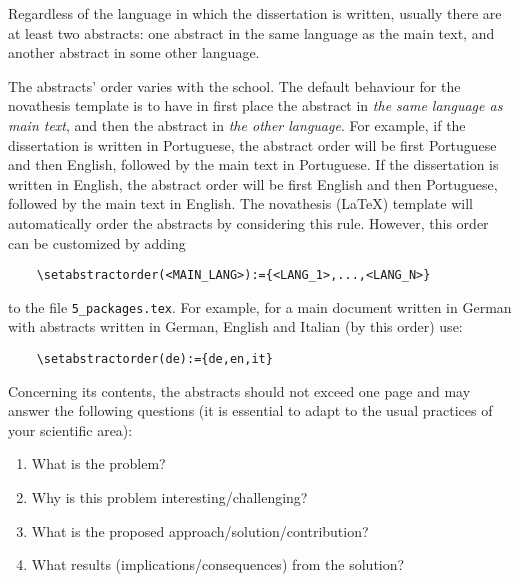 
%

Regardless of the language in which the dissertation is written, usually there are at least two abstracts: one abstract in the same language as the main text, and another abstract in some other language.

The abstracts' order varies with the school.  The default behaviour for the \gls{novathesis} template is to have in first place the abstract in \emph{the same language as main text}, and then the abstract in \emph{the other language}. For example, if the dissertation is written in Portuguese, the abstract order will be first Portuguese and then English, followed by the main text in Portuguese. If the dissertation is written in English, the abstract order will be first English and then Portuguese, followed by the main text in English.
%
The \gls{novathesis} (\LaTeX) template will automatically order the abstracts by considering this rule. However, this order can be customized by adding
\begin{verbatim}
    \setabstractorder(<MAIN_LANG>):={<LANG_1>,...,<LANG_N>}
\end{verbatim}
\noindent to the file \verb!5_packages.tex!.  For example, for a main document written in German with abstracts written in German, English and Italian (by this order) use:
\begin{verbatim}
    \setabstractorder(de):={de,en,it}
\end{verbatim}

Concerning its contents, the abstracts should not exceed one page and may answer the following questions (it is essential to adapt to the usual practices of your scientific area):

\begin{enumerate}
  \item What is the problem?
  \item Why is this problem interesting/challenging?
  \item What is the proposed approach/solution/contribution?
  \item What results (implications/consequences) from the solution?
\end{enumerate}

